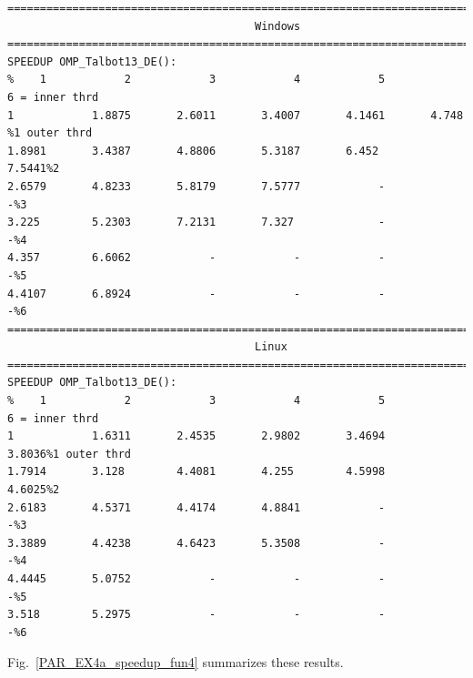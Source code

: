 \documentclass[a4paper,10pt]{report}%
\begin{document}
\begin{lstlisting}
====================================================================================
                                      Windows
====================================================================================
SPEEDUP OMP_Talbot13_DE():
%    1            2            3            4            5            6 = inner thrd
1            1.8875       2.6011       3.4007       4.1461       4.748 %1 outer thrd
1.8981       3.4387       4.8806       5.3187       6.452        7.5441%2
2.6579       4.8233       5.8179       7.5777            -            -%3
3.225        5.2303       7.2131       7.327             -            -%4
4.357        6.6062            -            -            -            -%5
4.4107       6.8924            -            -            -            -%6
====================================================================================
                                      Linux
====================================================================================
SPEEDUP OMP_Talbot13_DE():
%    1            2            3            4            5            6 = inner thrd
1            1.6311       2.4535       2.9802       3.4694       3.8036%1 outer thrd
1.7914       3.128        4.4081       4.255        4.5998       4.6025%2
2.6183       4.5371       4.4174       4.8841            -            -%3
3.3889       4.4238       4.6423       5.3508            -            -%4
4.4445       5.0752            -            -            -            -%5
3.518        5.2975            -            -            -            -%6
\end{lstlisting}
Fig.~\ref{PAR_EX4a_speedup_fun4} summarizes these results.
\end{document}
